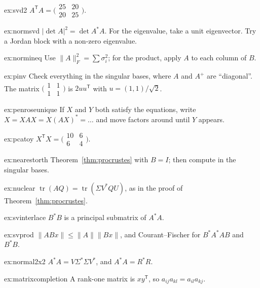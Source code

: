 \begin{hint}{ex:svd2}
$A^{\mathsf T}A=\bigl(\begin{smallmatrix}25&20\\20&25\end{smallmatrix}\bigr)$.
\end{hint}
\begin{hint}{ex:normsvd}
$|\det A|^2=\det A^*A$. For the eigenvalue, take a unit eigenvector. Try a Jordan block with a non-zero eigenvalue.
\end{hint}
\begin{hint}{ex:normineq}
Use $\|A\|_F^2=\sum\sigma_i^2$; for the product, apply $A$ to each column of $B$.
\end{hint}
\begin{hint}{ex:pinv}
Check everything in the singular bases, where $A$ and $A^+$ are ``diagonal''. The matrix $\bigl(\begin{smallmatrix}1&1\\1&1\end{smallmatrix}\bigr)$
is $2uu^{\mathsf T}$ with $u=(1,1)/\sqrt2$.
\end{hint}
\begin{hint}{ex:penroseunique}
If $X$ and $Y$ both satisfy the equations, write $X=XAX=X(AX)^*=\dots$ and move factors around until $Y$ appears.
\end{hint}
\begin{hint}{ex:pcatoy}
$X^{\mathsf T}X=\bigl(\begin{smallmatrix}10&6\\6&4\end{smallmatrix}\bigr)$.
\end{hint}
\begin{hint}{ex:nearestorth}
Theorem~\ref{thm:procrustes} with $B=I$; then compute in the singular bases.
\end{hint}
\begin{hint}{ex:nuclear}
$\operatorname{tr}(AQ)=\operatorname{tr}(\Sigma V^*QU)$, as in the proof of Theorem~\ref{thm:procrustes}.
\end{hint}
\begin{hint}{ex:svinterlace}
$B^*B$ is a principal submatrix of $A^*A$.
\end{hint}
\begin{hint}{ex:svprod}
$\|ABx\|\le\|A\|\|Bx\|$, and Courant--Fischer for $B^*A^*AB$ and $B^*B$.
\end{hint}
\begin{hint}{ex:normal2x2}
$A^*A=V\Sigma^*\Sigma V^*$, and $A^*A=R^*R$.
\end{hint}
\begin{hint}{ex:matrixcompletion}
A rank-one matrix is $xy^{\mathsf T}$, so $a_{ij}a_{kl}=a_{il}a_{kj}$.
\end{hint}

